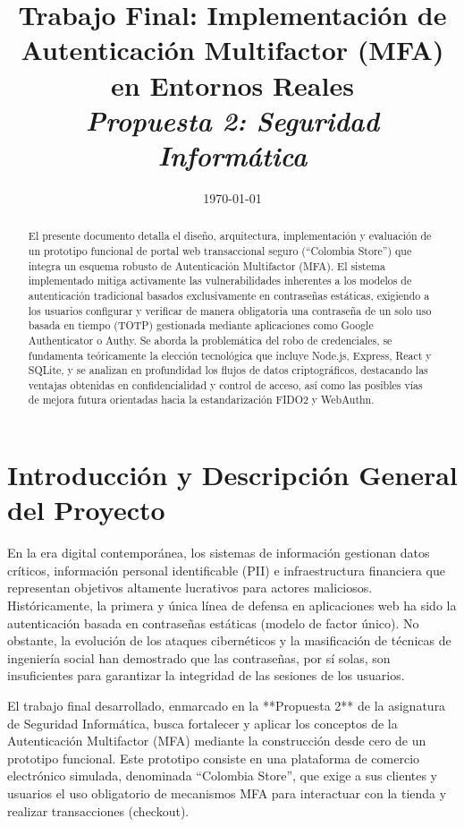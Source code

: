 \documentclass[12pt,a4paper]{article}
\title{
    \vspace{-2cm}
    \Huge\textbf{Trabajo Final: Implementación de Autenticación Multifactor (MFA) en Entornos Reales}\\
    \vspace{0.5cm}
    \Large\textit{Propuesta 2: Seguridad Informática}
}
\author{}
\date{\today}
\begin{document}
\maketitle
\thispagestyle{empty}

\vspace{2cm}
\begin{abstract}
\noindent El presente documento detalla el diseño, arquitectura, implementación y evaluación de un prototipo funcional de portal web transaccional seguro (``Colombia Store'') que integra un esquema robusto de Autenticación Multifactor (MFA). El sistema implementado mitiga activamente las vulnerabilidades inherentes a los modelos de autenticación tradicional basados exclusivamente en contraseñas estáticas, exigiendo a los usuarios configurar y verificar de manera obligatoria una contraseña de un solo uso basada en tiempo (TOTP) gestionada mediante aplicaciones como Google Authenticator o Authy. Se aborda la problemática del robo de credenciales, se fundamenta teóricamente la elección tecnológica que incluye Node.js, Express, React y SQLite, y se analizan en profundidad los flujos de datos criptográficos, destacando las ventajas obtenidas en confidencialidad y control de acceso, así como las posibles vías de mejora futura orientadas hacia la estandarización FIDO2 y WebAuthn.
\end{abstract}

\newpage
\tableofcontents
\newpage

\section{Introducción y Descripción General del Proyecto}

En la era digital contemporánea, los sistemas de información gestionan datos críticos, información personal identificable (PII) e infraestructura financiera que representan objetivos altamente lucrativos para actores maliciosos. Históricamente, la primera y única línea de defensa en aplicaciones web ha sido la autenticación basada en contraseñas estáticas (modelo de factor único). No obstante, la evolución de los ataques cibernéticos y la masificación de técnicas de ingeniería social han demostrado que las contraseñas, por sí solas, son insuficientes para garantizar la integridad de las sesiones de los usuarios.

El trabajo final desarrollado, enmarcado en la **Propuesta 2** de la asignatura de Seguridad Informática, busca fortalecer y aplicar los conceptos de la Autenticación Multifactor (MFA) mediante la construcción desde cero de un prototipo funcional. Este prototipo consiste en una plataforma de comercio electrónico simulada, denominada ``Colombia Store'', que exige a sus clientes y usuarios el uso obligatorio de mecanismos MFA para interactuar con la tienda y realizar transacciones (checkout).
\end{document}
